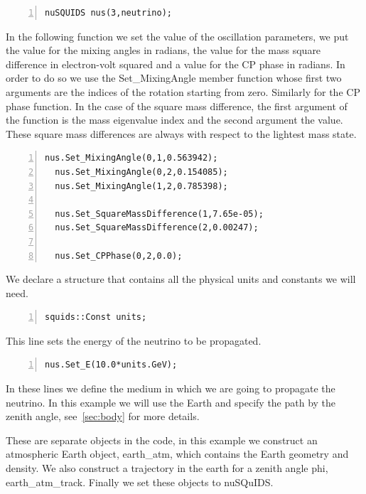 \documentclass[3p,12pt]{elsarticle}
\newcommand{\ttf}{\ttfamily}
\begin{document}
\begin{lstlisting}[frame=leftline, numbers = left,breaklines=true, label = ex:sin1]
  nuSQUIDS nus(3,neutrino);
\end{lstlisting}

In the following function we set the value of the oscillation parameters, we put
the value for the mixing angles in radians, the value for the mass
square difference in electron-volt squared and a value for the CP
phase in radians.
In order to do so we use the {\ttf Set\_MixingAngle} member function
whose first two arguments are the indices of the rotation  starting
from zero. Similarly for the CP phase function.
In the case of the square mass difference, the first argument of the function is
the mass eigenvalue index and the second argument the value. These
square mass differences are always with respect to the lightest mass state.
 
\begin{lstlisting}[frame=leftline, numbers = left,breaklines=true, label = ex:sin1,firstnumber=last]
  nus.Set_MixingAngle(0,1,0.563942);
  nus.Set_MixingAngle(0,2,0.154085);
  nus.Set_MixingAngle(1,2,0.785398);

  nus.Set_SquareMassDifference(1,7.65e-05);
  nus.Set_SquareMassDifference(2,0.00247);

  nus.Set_CPPhase(0,2,0.0);
\end{lstlisting}

We declare a structure that contains all the physical units and
constants we will need. 
\begin{lstlisting}[frame=leftline, numbers = left,breaklines=true, label = ex:sin1,firstnumber=last]
  squids::Const units;
\end{lstlisting}

This line sets the energy of the neutrino to be propagated.
\begin{lstlisting}[frame=leftline, numbers = left,breaklines=true, label = ex:sin1,firstnumber=last]
  nus.Set_E(10.0*units.GeV);
\end{lstlisting}

In these lines we define the medium in which we are going to propagate
the neutrino. In this example we will use the Earth and specify the
path by the zenith angle, see~\ref{sec:body} for more details.

These are separate objects in the code, in this example we construct
an atmospheric Earth object, {\ttf earth\_atm}, which contains the
Earth geometry and density. We also construct a trajectory in the
earth for a zenith angle {\ttf phi}, {\ttf earth\_atm\_track}. Finally
we set these objects to nuSQuIDS.
\end{document}
